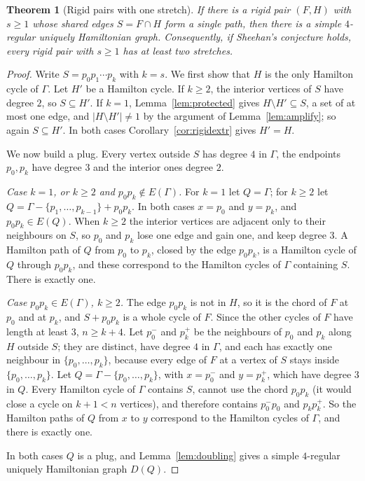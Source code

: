 \documentclass[11pt,a4paper]{article}
\newtheorem{theorem}{Theorem}[section]
\theoremstyle{definition}
\theoremstyle{remark}
\begin{document}
\begin{theorem}[Rigid pairs with one stretch]\label{thm:onestretch}
If there is a rigid pair $(F,H)$ with $s\ge1$ whose shared edges $S=F\cap H$ form a single path, then there is a simple $4$-regular uniquely Hamiltonian graph. Consequently, if Sheehan's conjecture holds, every rigid pair with $s\ge1$ has at least two stretches.
\end{theorem}

\begin{proof}
Write $S=p_0p_1\cdots p_k$ with $k=s$. We first show that $H$ is the only Hamilton cycle of $\Gamma$. Let $H'$ be a Hamilton cycle. If $k\ge2$, the interior vertices of $S$ have degree $2$, so $S\subseteq H'$. If $k=1$, Lemma~\ref{lem:protected} gives $H\setminus H'\subseteq S$, a set of at most one edge, and $|H\setminus H'|\ne1$ by the argument of Lemma~\ref{lem:amplify}; so again $S\subseteq H'$. In both cases Corollary~\ref{cor:rigidextr} gives $H'=H$.

We now build a plug. Every vertex outside $S$ has degree $4$ in $\Gamma$, the endpoints $p_0,p_k$ have degree $3$ and the interior ones degree $2$.

\emph{Case $k=1$, or $k\ge2$ and $p_0p_k\notin E(\Gamma)$.} For $k=1$ let $Q=\Gamma$; for $k\ge2$ let $Q=\Gamma-\{p_1,\dots,p_{k-1}\}+p_0p_k$. In both cases $x=p_0$ and $y=p_k$, and $p_0p_k\in E(Q)$. When $k\ge2$ the interior vertices are adjacent only to their neighbours on $S$, so $p_0$ and $p_k$ lose one edge and gain one, and keep degree $3$. A Hamilton path of $Q$ from $p_0$ to $p_k$, closed by the edge $p_0p_k$, is a Hamilton cycle of $Q$ through $p_0p_k$, and these correspond to the Hamilton cycles of $\Gamma$ containing $S$. There is exactly one.

\emph{Case $p_0p_k\in E(\Gamma)$, $k\ge2$.} The edge $p_0p_k$ is not in $H$, so it is the chord of $F$ at $p_0$ and at $p_k$, and $S+p_0p_k$ is a whole cycle of $F$. Since the other cycles of $F$ have length at least $3$, $n\ge k+4$. Let $p_0^-$ and $p_k^+$ be the neighbours of $p_0$ and $p_k$ along $H$ outside $S$; they are distinct, have degree $4$ in $\Gamma$, and each has exactly one neighbour in $\{p_0,\dots,p_k\}$, because every edge of $F$ at a vertex of $S$ stays inside $\{p_0,\dots,p_k\}$. Let $Q=\Gamma-\{p_0,\dots,p_k\}$, with $x=p_0^-$ and $y=p_k^+$, which have degree $3$ in $Q$. Every Hamilton cycle of $\Gamma$ contains $S$, cannot use the chord $p_0p_k$ (it would close a cycle on $k+1<n$ vertices), and therefore contains $p_0^-p_0$ and $p_kp_k^+$. So the Hamilton paths of $Q$ from $x$ to $y$ correspond to the Hamilton cycles of $\Gamma$, and there is exactly one.

In both cases $Q$ is a plug, and Lemma~\ref{lem:doubling} gives a simple $4$-regular uniquely Hamiltonian graph $D(Q)$.
\end{proof}
\end{document}
